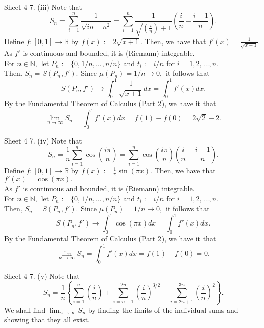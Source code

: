 \documentclass[handout, aspectratio=169]{beamer}
\begin{document}
\begin{frame}{Sheet 4}
	7. (iii) Note that \\
	\[S_n = \sum_{i=1}^{n}\dfrac{1}{\sqrt{in + n^2}} = \sum_{i=1}^{n}\dfrac{1}{\sqrt{\left(\frac{i}{n}\right) + 1}}\left(\frac{i}{n} - \frac{i-1}{n}\right) .\]
	Define $f:[0, 1] \to \mathbb{R}$ by $f(x) := 2\sqrt{x + 1}.$ Then, we have that $f'(x) = \frac{1}{\sqrt{x+ 1}}.$\\
	As $f'$ is continuous and bounded, it is (Riemann) integrable. \\
	For $n \in \mathbb{N},$ let $P_n := \{0, 1/n, \ldots, n/n\}$ and $t_i := i/n$ for $i = 1, 2, \ldots, n.$\\
	Then, $S_n = S(P_n, f').$ Since $\mu(P_n) = 1/n \to 0,$ it follows that
	\[S(P_n, f') \to \int_{0}^{1} \frac{1}{\sqrt{x+ 1}} dx = \int_{0}^{1} f'(x) dx. \]
	By the Fundamental Theorem of Calculus (Part 2), we have it that
	\[\lim_{n\to \infty}S_n = \int_{0}^{1} f'(x) dx = f(1) - f(0) = 2\sqrt{2} - 2.\]
\end{frame}
\begin{frame}{Sheet 4}
	7. (iv) Note that \\
	\[S_n = \dfrac{1}{n}\sum_{i=1}^{n}\cos\left(\dfrac{i\pi}{n}\right) = \sum_{i=1}^{n}\cos\left(\dfrac{i\pi}{n}\right)\left(\frac{i}{n} - \frac{i-1}{n}\right) .\]
	Define $f:[0, 1] \to \mathbb{R}$ by $f(x) := \frac{1}{\pi}\sin(\pi x).$ Then, we have that $f'(x) = \cos(\pi x).$\\
	As $f'$ is continuous and bounded, it is (Riemann) integrable. \\
	For $n \in \mathbb{N},$ let $P_n := \{0, 1/n, \ldots, n/n\}$ and $t_i := i/n$ for $i = 1, 2, \ldots, n.$\\
	Then, $S_n = S(P_n, f').$ Since $\mu(P_n) = 1/n \to 0,$ it follows that
	\[S(P_n, f') \to \int_{0}^{1} \cos(\pi x) dx = \int_{0}^{1} f'(x) dx. \]
	By the Fundamental Theorem of Calculus (Part 2), we have it that
	\[\lim_{n\to \infty}S_n = \int_{0}^{1} f'(x) dx = f(1) - f(0) = 0.\]
\end{frame}
\begin{frame}{Sheet 4}
	7. (v) Note that \\
	\[S_n = \dfrac{1}{n}\left\{\sum_{i=1}^{n}\left(\frac{i}{n}\right) + \sum_{i=n+1}^{2n}\left(\frac{i}{n}\right)^{3/2} + \sum_{i=2n+1}^{3n}\left(\frac{i}{n}\right)^2\right\} .\]
	We shall find $\displaystyle\lim_{n\to \infty}S_n$ by finding the limits of the individual sums and showing that they all exist.\\
\end{frame}
	
\end{document}
